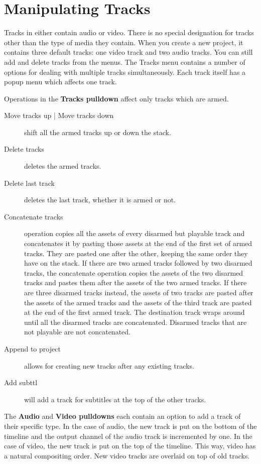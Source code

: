 \section{Manipulating Tracks}%
\label{sec:manipulating_tracks}

Tracks in \CGG{} either contain audio or video.  There is no special
designation for tracks other than the type of media they contain.
When you create a new project, it contains three default tracks: one
video track and two audio tracks.  You can still add and delete
tracks from the menus.  The Tracks menu contains a number of options
for dealing with multiple tracks simultaneously.  Each track itself
has a popup menu which affects one track.

Operations in the \textbf{Tracks pulldown} affect only tracks which
are armed.

\begin{description}
\item[Move tracks up | Move tracks down] shift all the armed
  tracks up or down the stack.
\item[Delete tracks] deletes the armed tracks.
\item[Delete last track] deletes the last track, whether it is
  armed or not.
\item[Concatenate tracks] operation copies all the assets of
  every disarmed but playable track and concatenates it by pasting
  those assets at the end of the first set of armed tracks. They are
  pasted one after the other, keeping the same order they have on the
  stack. If there are two armed tracks followed by two disarmed
  tracks, the concatenate operation copies the assets of the two
  disarmed tracks and pastes them after the assets of the two armed
  tracks. If there are three disarmed tracks instead, the assets of
  two tracks are pasted after the assets of the armed tracks and the
  assets of the third track are pasted at the end of the first armed
  track. The destination track wraps around until all the disarmed
  tracks are concatenated. Disarmed tracks that are not playable are
  not concatenated.
\item[Append to project] allows for creating new tracks after
  any existing tracks.
\item[Add subttl] will add a track for subtitles at the top of
  the other tracks.
\end{description}

The \textbf{Audio} and \textbf{Video pulldowns} each contain an
option to add a track of their specific type. In the case of audio,
the new track is put on the bottom of the timeline and the output
channel of the audio track is incremented by one. In the case of
video, the new track is put on the top of the timeline. This way,
video has a natural compositing order. New video tracks are overlaid
on top of old tracks.


